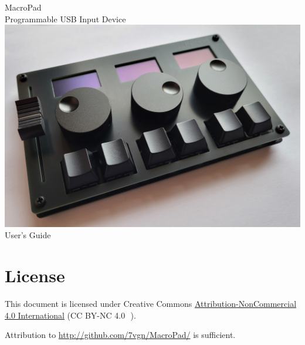 \documentclass{article}
\begin{document}
\hypersetup{pageanchor=false}
\begin{titlepage}
\thispagestyle{empty}
\centering
\textsf{\Huge MacroPad}\\[1cm]
\textsf{\Large Programmable USB Input Device}\\[3cm]
\includegraphics[width=\textwidth]{Images/Title.jpg}\\[3cm]
\textsf{\Large User's Guide}
\end{titlepage}
\hypersetup{pageanchor=true}

\section*{License}
This document is licensed under Creative Commons \href{https://creativecommons.org/licenses/by-nc/4.0/}{Attribution-NonCommercial 4.0 International} (CC BY-NC 4.0 \ccCopy\,\ccAttribution\,\ccNonCommercial).

Attribution to \href{http://github.com/7vgn/MacroPad/}{http://github.com/7vgn/MacroPad/} is sufficient.
\tableofcontents
\end{document}
